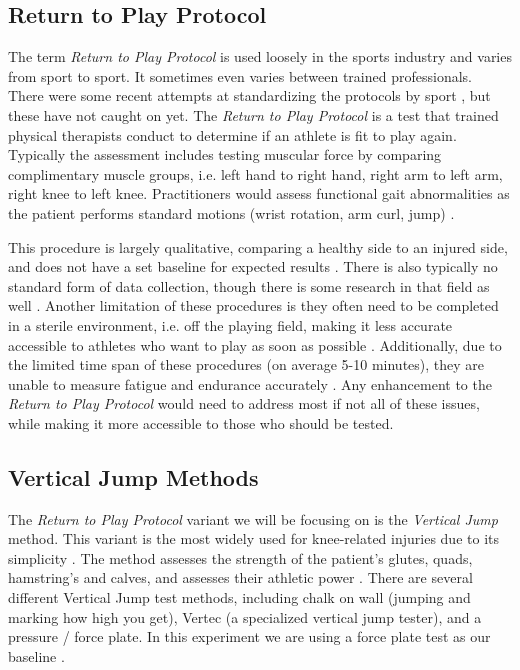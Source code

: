 \documentclass[manuscript,screen,review]{acmart}
\begin{document}
\subsection{Return to Play Protocol}

The term \textit{Return to Play Protocol} is used loosely in the sports industry and varies from sport to sport. It sometimes even varies between trained professionals. There were some recent attempts at standardizing the protocols by sport \cite{doi:10.1080/00913847.2017.1288544}, but these have not caught on yet. The \textit{Return to Play Protocol} is a test that trained physical therapists conduct to determine if an athlete is fit to play again. Typically the assessment includes testing muscular force by comparing complimentary muscle groups, i.e. left hand to right hand, right arm to left arm, right knee to left knee. Practitioners would assess functional gait abnormalities as the patient performs standard motions (wrist rotation, arm curl, jump) \cite{doi:10.1080/00913847.2017.1288544}.

This procedure is largely qualitative, comparing a healthy side to an injured side, and does not have a set baseline for expected results \cite{doi:10.1080/00913847.2017.1288544}. There is also typically no standard form of data collection, though there is some research in that field as well \cite{10.1093/arclin/18.3.293}. Another limitation of these procedures is they often need to be completed in a sterile environment, i.e. off the playing field, making it less accurate accessible to athletes who want to play as soon as possible \cite{doi:10.1080/00913847.2017.1288544}. Additionally, due to the limited time span of these procedures (on average 5-10 minutes), they are unable to measure fatigue and endurance accurately \cite{10.1093/arclin/18.3.293}. Any enhancement to the \textit{Return to Play Protocol} would need to address most if not all of these issues, while making it more accessible to those who should be tested.

\subsection{Vertical Jump Methods}

The \textit{Return to Play Protocol} variant we will be focusing on is the \textit{Vertical Jump} method. This variant is the most widely used for knee-related injuries due to its simplicity \cite{Petersen2013}. The method assesses the strength of the patient's glutes, quads, hamstring's and calves, and assesses their athletic power \cite{Petersen2013}. There are several different Vertical Jump test methods, including chalk on wall (jumping and marking how high you get), Vertec (a specialized vertical jump tester), and a pressure / force plate. In this experiment we are using a force plate test as our baseline \cite{Petersen2013}.
\end{document}
